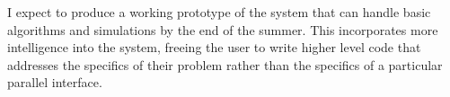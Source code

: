 \documentclass[12pt]{article}
\begin{document}
I expect to produce a working prototype of the system that can handle basic
algorithms and simulations by the end of the summer. This incorporates more
intelligence into the system, freeing the user to write higher level code
that addresses the specifics of their problem rather than the specifics of
a particular parallel interface.

% 
% 

\hfill


 
\end{document}
